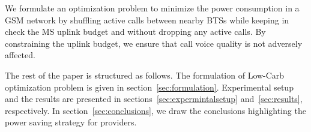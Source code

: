 We formulate an optimization problem to minimize the power
consumption in a GSM network by shuffling active calls between
nearby BTSs while keeping in check the MS uplink budget and without dropping any active calls. By constraining the uplink budget, we ensure that call voice quality is not adversely affected. 

The rest of the paper is structured as follows. The formulation
of Low-Carb optimization problem is given in
section~\ref{sec:formulation}. Experimental setup and the
results are presented in sections~\ref{sec:expermintalsetup}
and~\ref{sec:results}, respectively. In
section~\ref{sec:conclusions}, we draw the conclusions
highlighting the power saving strategy for providers.